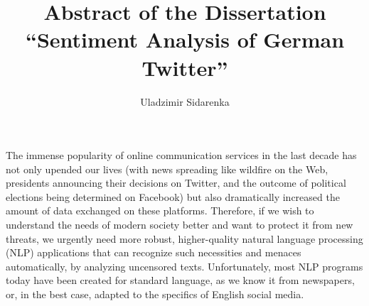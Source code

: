 \documentclass[a4paper,11pt]{article}
\author{Uladzimir Sidarenka}
\title{  {\large Abstract of the Dissertation}\\
  {\Large ``Sentiment Analysis of German Twitter''}}
\date{\vspace{-5ex}}
\begin{document}
\maketitle

The immense popularity of online communication services in the last
decade has not only upended our lives (with news spreading like
wildfire on the Web, presidents announcing their decisions on Twitter,
and the outcome of political elections being determined on Facebook)
but also dramatically increased the amount of data exchanged on these
platforms.  Therefore, if we wish to understand the needs of modern
society better and want to protect it from new threats, we urgently
need more robust, higher-quality natural language processing (NLP)
applications that can recognize such necessities and menaces
automatically, by analyzing uncensored texts.  Unfortunately, most NLP
programs today have been created for standard language, as we know it
from newspapers, or, in the best case, adapted to the specifics of
English social media.
\end{document}
